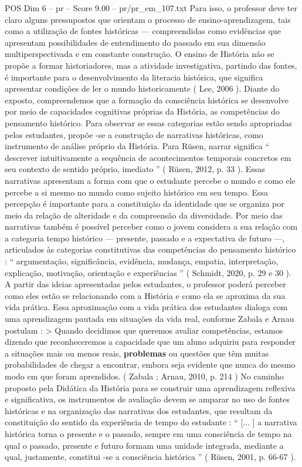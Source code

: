 \begin{textsample}{POS Dim 6 – pr – Score 9.00 – pr/pr\_em\_107.txt}
Para isso, o professor deve ter claro alguns pressupostos que orientam o processo de ensino-aprendizagem, tais como a utilização de fontes históricas — compreendidas como evidências que apresentam possibilidades de entendimento do passado em sua dimensão multiperspectivada e em constante construção.
O ensino de História não se propõe a formar historiadores, mas a atividade investigativa, partindo das fontes, é importante para o desenvolvimento da literacia histórica, que significa apresentar condições de ler o mundo historicamente ( Lee, 2006 ).
Diante do exposto, compreendemos que a formação da consciência histórica se desenvolve por meio de capacidades cognitivas próprias da História, as competências do pensamento histórico.
Para observar se essas categorias estão sendo apropriadas pelos estudantes, propõe -se a construção de narrativas históricas, como instrumento de análise próprio da História.
Para Rüsen, narrar significa “ descrever intuitivamente a sequência de acontecimentos temporais concretos em seu contexto de sentido próprio, imediato ” ( Rüsen, 2012, p. 33 ).
Essas narrativas apresentam a forma com que o estudante percebe o mundo e como ele percebe a si mesmo no mundo como sujeito histórico em seu tempo.
Essa percepção é importante para a constituição da identidade que se organiza por meio da relação de alteridade e da compreensão da diversidade.
Por meio das narrativas também é possível perceber como o jovem considera a sua relação com a categoria tempo histórico — presente, passado e a expectativa de futuro —, articulados às categorias constitutivas das competências do pensamento histórico : “ argumentação, significância, evidência, mudança, empatia, interpretação, explicação, motivação, orientação e experiências ” ( Schmidt, 2020, p. 29 e 30 ).
A partir das ideias apresentadas pelos estudantes, o professor poderá perceber como eles estão se relacionando com a História e como ela se aproxima da sua vida prática.
Essa aproximação com a vida prática dos estudantes dialoga com uma aprendizagem pautada em situações da vida real, conforme Zabala e Arnau postulam : > Quando decidimos que queremos avaliar competências, estamos dizendo que reconheceremos a capacidade que um aluno adquiriu para responder a situações mais ou menos reais, \textbf{problemas} ou questões que têm muitas probabilidades de chegar a encontrar, embora seja evidente que nunca do mesmo modo em que foram aprendidos. ( Zabala ; Arnau, 2010, p. 214 ) No caminho proposto pela Didática da História para se construir uma aprendizagem reflexiva e significativa, os instrumentos de avaliação devem se amparar no uso de fontes históricas e na organização das narrativas dos estudantes, que resultam da constituição do sentido da experiência de tempo do estudante : “ [... ] a narrativa histórica torna o presente e o passado, sempre em uma consciência de tempo na qual o passado, presente e futuro formam uma unidade integrada, mediante a qual, justamente, constitui -se a consciência histórica ” ( Rüsen, 2001, p. 66-67 ).

\end{textsample}
